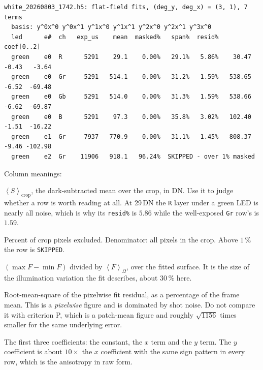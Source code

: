 \documentclass[11pt, a4paper]{article}
\newcommand{\code}[1]{\texttt{#1}}
\newcommand{\pct}{\,\%}
\newcommand{\mean}[2]{\left\langle #1 \right\rangle_{#2}}
\begin{document}
\begin{footnotesize}
\begin{verbatim}
white_20260803_1742.h5: flat-field fits, (deg_y, deg_x) = (3, 1), 7 terms
  basis: y^0x^0 y^0x^1 y^1x^0 y^1x^1 y^2x^0 y^2x^1 y^3x^0
  led      e#  ch   exp_us    mean  masked%   span%  resid%  coef[0..2]
  green    e0  R      5291    29.1    0.00%   29.1%   5.86%    30.47  -0.43   -3.64
  green    e0  Gr     5291   514.1    0.00%   31.2%   1.59%   538.65  -6.52  -69.48
  green    e0  Gb     5291   514.0    0.00%   31.3%   1.59%   538.66  -6.62  -69.87
  green    e0  B      5291    97.3    0.00%   35.8%   3.02%   102.40  -1.51  -16.22
  green    e1  Gr     7937   770.9    0.00%   31.1%   1.45%   808.37  -9.46 -102.98
  green    e2  Gr    11906   918.1   96.24%  SKIPPED - over 1% masked
\end{verbatim}
\end{footnotesize}

\noindent
Column meanings:

\begin{description}[style=nextline, leftmargin=1em, nosep]
\item[\code{mean}]
  $\mean{S}{\mathrm{crop}}$, the dark-subtracted mean over the crop, in DN.
  Use it to judge whether a row is worth reading at all.
  At 29\,DN the \code{R} layer under a green LED is nearly all noise,
  which is why its \code{resid\%} is $5.86$
  while the well-exposed \code{Gr} row's is $1.59$.
\item[\code{masked\%}]
  Percent of crop pixels excluded.
  Denominator: all pixels in the crop.
  Above $1\pct$ the row is \code{SKIPPED}.
\item[\code{span\%}]
  $(\max F - \min F)$ divided by $\mean{F}{\Omega}$,
  over the fitted surface.
  It is the size of the illumination variation the fit describes,
  about $30\pct$ here.
\item[\code{resid\%}]
  Root-mean-square of the pixelwise fit residual,
  as a percentage of the frame mean.
  This is a \emph{pixelwise} figure and is dominated by shot noise.
  Do not compare it with criterion P,
  which is a patch-mean figure and roughly $\sqrt{1156}$ times smaller
  for the same underlying error.
\item[\code{coef[0..2]}]
  The first three coefficients:
  the constant, the $x$ term and the $y$ term.
  The $y$ coefficient is about $10\times$ the $x$ coefficient
  with the same sign pattern in every row,
  which is the anisotropy in raw form.
\end{description}
\end{document}
